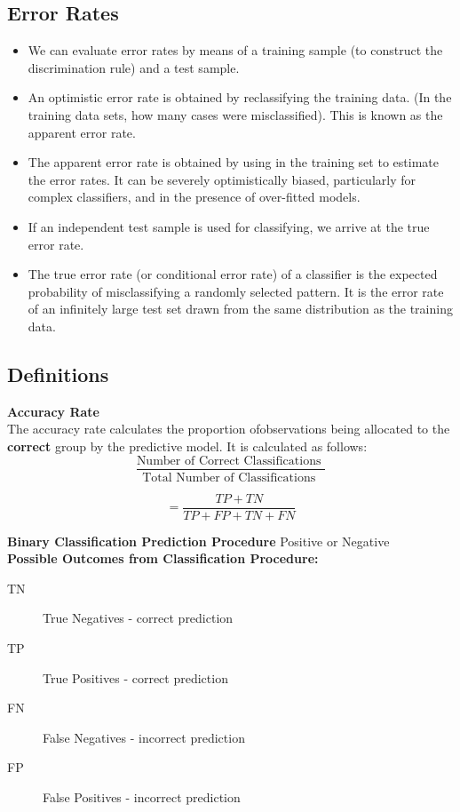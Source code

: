 \documentclass[]{report}
\begin{document}
\subsection*{Error Rates}
\begin{itemize}
	\item We can evaluate error rates by means of a training sample (to construct the
	discrimination rule) and a test sample.
	\item An optimistic error rate is obtained by reclassifying the training data. (In
	the training data sets, how many cases were misclassified). This is known
	as the apparent error rate.
	\item The apparent error rate is obtained by using in the training set to estimate
	the error rates. It can be severely optimistically biased, particularly for
	complex classifiers, and in the presence of over-fitted models.
	\item If an independent test sample is used for classifying, we arrive at the true
	error rate.
		\item The true error rate (or conditional error rate) of a classifier is the
	expected probability of misclassifying a randomly selected pattern. It is the
	error rate of an infinitely large test set drawn from the same distribution as
	the training data.
\end{itemize}


\subsection*{Definitions}
\textbf{Accuracy Rate}\\
The accuracy rate calculates the proportion ofobservations being allocated to the \textbf{correct} group by the predictive model. It is calculated as follows:
\[ \frac{
\mbox{Number of Correct Classifications }}{\mbox{Total Number of Classifications }} \]

\[ = \frac{TP + TN}{TP+FP+TN+FN}\]

\newpage



 \textbf{Binary Classification Prediction Procedure} Positive or Negative \\ \bigskip
 \textbf{Possible Outcomes from Classification Procedure:}\\ \bigskip
\begin{description}
\item[TN] True Negatives - correct prediction
\item[TP] True Positives - correct prediction
\item[FN] False Negatives - incorrect prediction
\item[FP] False Positives - incorrect prediction
\end{description}
\end{document}
